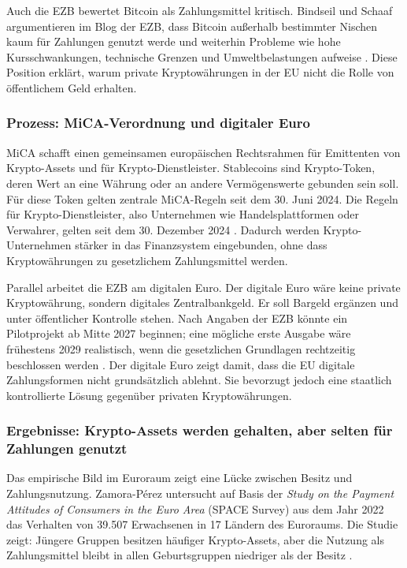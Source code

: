 Auch die EZB bewertet Bitcoin als Zahlungsmittel kritisch. Bindseil und Schaaf argumentieren im Blog der EZB, dass Bitcoin außerhalb bestimmter Nischen kaum für Zahlungen genutzt werde und weiterhin Probleme wie hohe Kursschwankungen, technische Grenzen und Umweltbelastungen aufweise \cite{Bindseil2024}. Diese Position erklärt, warum private Kryptowährungen in der EU nicht die Rolle von öffentlichem Geld erhalten.

\subsubsection{Prozess: MiCA-Verordnung und digitaler Euro}

MiCA schafft einen gemeinsamen europäischen Rechtsrahmen für Emittenten von Krypto-Assets und für Krypto-Dienstleister. Stablecoins sind Krypto-Token, deren Wert an eine Währung oder an andere Vermögenswerte gebunden sein soll. Für diese Token gelten zentrale MiCA-Regeln seit dem 30. Juni 2024. Die Regeln für Krypto-Dienstleister, also Unternehmen wie Handelsplattformen oder Verwahrer, gelten seit dem 30. Dezember 2024 \cite{BundesbankMiCAR}. Dadurch werden Krypto-Unternehmen stärker in das Finanzsystem eingebunden, ohne dass Kryptowährungen zu gesetzlichem Zahlungsmittel werden.

Parallel arbeitet die EZB am digitalen Euro. Der digitale Euro wäre keine private Kryptowährung, sondern digitales Zentralbankgeld. Er soll Bargeld ergänzen und unter öffentlicher Kontrolle stehen. Nach Angaben der EZB könnte ein Pilotprojekt ab Mitte 2027 beginnen; eine mögliche erste Ausgabe wäre frühestens 2029 realistisch, wenn die gesetzlichen Grundlagen rechtzeitig beschlossen werden \cite{ECB2025}. Der digitale Euro zeigt damit, dass die EU digitale Zahlungsformen nicht grundsätzlich ablehnt. Sie bevorzugt jedoch eine staatlich kontrollierte Lösung gegenüber privaten Kryptowährungen.

\subsubsection{Ergebnisse: Krypto-Assets werden gehalten, aber selten für Zahlungen genutzt}

Das empirische Bild im Euroraum zeigt eine Lücke zwischen Besitz und Zahlungsnutzung. Zamora-Pérez untersucht auf Basis der \emph{Study on the Payment Attitudes of Consumers in the Euro Area} (SPACE Survey) aus dem Jahr 2022 das Verhalten von 39.507 Erwachsenen in 17 Ländern des Euroraums. Die Studie zeigt: Jüngere Gruppen besitzen häufiger Krypto-Assets, aber die Nutzung als Zahlungsmittel bleibt in allen Geburtsgruppen niedriger als der Besitz \cite{Zamora2026}.

